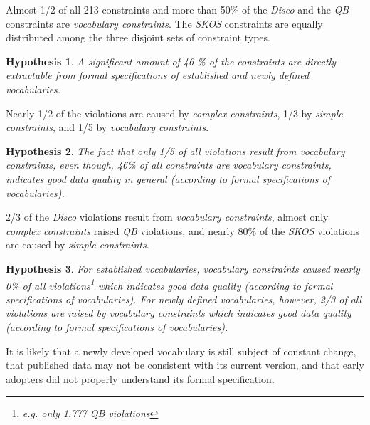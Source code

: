 \documentclass{llncs}
\newtheorem{hyp}{Hypothesis}
\begin{document}
{{%

Almost 1/2 of all 213 constraints and more than 50\% of the \emph{Disco} and the \emph{QB} constraints are \emph{vocabulary constraints}.
The \emph{SKOS} constraints are equally distributed among the three disjoint sets of constraint types. 
\begin{hyp}
A significant amount of 46 \% of the constraints are directly extractable from formal specifications of established and newly defined vocabularies. 
\end{hyp} 

Nearly 1/2 of the violations are caused by \emph{complex constraints}, 1/3 by \emph{simple constraints}, and 1/5 by \emph{vocabulary constraints}.

\begin{hyp}
The fact that only 1/5 of all violations result from vocabulary constraints, 
even though, 46\% of all constraints are vocabulary constraints,
indicates good data quality in general (according to formal specifications of vocabularies).
\end{hyp}

2/3 of the \emph{Disco} violations result from \emph{vocabulary constraints},
almost only \emph{complex constraints} raised \emph{QB} violations, and 
nearly 80\% of the \emph{SKOS} violations are caused by \emph{simple constraints}.

\begin{hyp}
For established vocabularies, vocabulary constraints caused nearly 0\% of all violations\footnote{e.g. only 1.777 \emph{QB} violations}
which indicates good data quality (according to formal specifications of vocabularies). 
For newly defined vocabularies, however, 2/3 of all violations are raised by vocabulary constraints
which indicates good data quality (according to formal specifications of vocabularies).
\end{hyp}

It is likely that a newly developed vocabulary is still subject of constant change, 
that published data may not be consistent with its current version,
and that early adopters did not properly understand its formal specification.

}}
\end{document}
